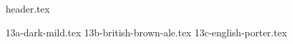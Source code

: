 \clearpage
{}
\divisorLine
{header.tex}
\begin{multicols*}{2}
{13a-dark-mild.tex}
{13b-british-brown-ale.tex}
{13c-english-porter.tex}
\end{multicols*}